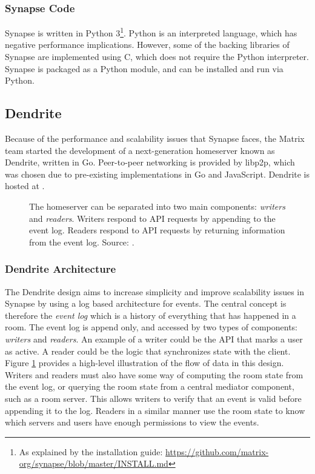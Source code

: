 \subsubsection{Synapse Code}
Synapse is written in Python 3\footnote{As explained by the installation guide: \url{https://github.com/matrix-org/synapse/blob/master/INSTALL.md}}.
Python is an interpreted language, which has negative performance implications.
However, some of the backing libraries of Synapse are implemented using C, which does not require the Python interpreter.
Synapse is packaged as a Python module, and can be installed and run via Python.

\subsection{Dendrite}
Because of the performance and scalability issues that Synapse faces, the Matrix team started the development of a next-generation homeserver known as Dendrite, written in Go.
Peer-to-peer networking is provided by libp2p, which was chosen due to pre-existing implementations in Go and JavaScript.
Dendrite is hosted at .

\begin{figure}
      \centering
      \resizebox{!}{!}{}
      \caption{
            The homeserver can be separated into two main components: \textit{writers} and \textit{readers}.
            Writers respond to API requests by appending to the event log.
            Readers respond to API requests by returning information from the event log.
            Source: \cite{dendrite_design_md}.
      }
      \label{fig:dendrite_design}
\end{figure}

\subsubsection{Dendrite Architecture}
The Dendrite design aims to increase simplicity and improve scalability issues in Synapse by using a log based architecture for events.
The central concept is therefore the \textit{event log} which is a history of everything that has happened in a room.
The event log is append only, and accessed by two types of components: \textit{writers} and \textit{readers}.
An example of a writer could be the API that marks a user as active.
A reader could be the logic that synchronizes state with the client.
Figure \ref{fig:dendrite_design} provides a high-level illustration of the flow of data in this design.
Writers and readers must also have some way of computing the room state from the event log, or querying the room state from a central mediator component, such as a room server.
This allows writers to verify that an event is valid before appending it to the log.
Readers in a similar manner use the room state to know which servers and users have enough permissions to view the events.

